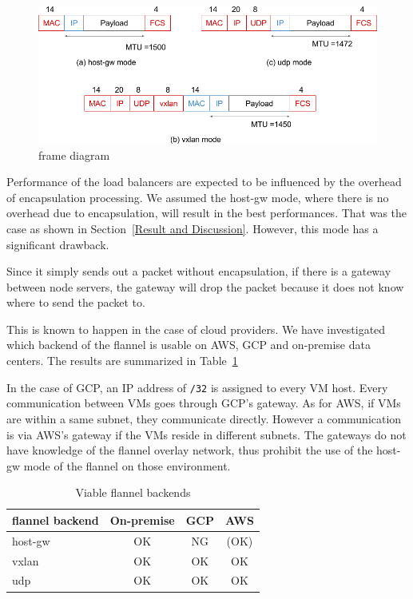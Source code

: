 \begin{figure}
\includegraphics[width=\columnwidth]{Figs/flannel-packet-diagram}
\caption{frame diagram}
\label{fig:flannel-packet-diagram}
\end{figure}

Performance of the load balancers are expected to be influenced by the overhead of encapsulation processing.
We assumed the host-gw mode, where there is no overhead due to encapsulation, will result in the best performances.
That was the case as shown in Section~\ref{Result and Discussion}.
However, this mode has a significant drawback.

Since it simply sends out a packet without encapsulation, 
if there is a gateway between node servers, 
the gateway will drop the packet because it does not know where to send the packet to.

This is known to happen in the case of cloud providers.  
We have investigated which backend of the flannel is usable on AWS, GCP and on-premise data centers.
The results are summarized in Table~\ref{tab:Viable flannel backends}

In the case of GCP, an IP address of {\tt /32} is assigned to every VM host.
Every communication between VMs goes through GCP's gateway.
As for AWS, if VMs are within a same subnet, they communicate directly.
However a communication is via AWS's gateway if the VMs reside in different subnets.
The gateways do not have knowledge of the flannel overlay network, 
thus prohibit the use of the host-gw mode of the flannel on those environment.  

\begin{table}
  \begin{tabular}{lccc}
    \toprule
    flannel backend & On-premise & GCP & AWS \\
    \midrule
    host-gw & OK & NG & (OK) \\
    vxlan & OK & OK & OK \\
    udp & OK & OK & OK \\
    \bottomrule
\end{tabular}
  \caption{Viable flannel backends}
  \label{tab:Viable flannel backends}
\end{table}


